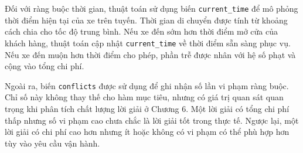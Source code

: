 \documentclass[12pt,a4paper]{article}
\numberwithin{figure}{subsection}
\numberwithin{table}{subsection}
\begin{document}
Đối với ràng buộc thời gian, thuật toán sử dụng biến \texttt{current\_time} để mô phỏng thời điểm hiện tại của xe trên tuyến. Thời gian di chuyển được tính từ khoảng cách chia cho tốc độ trung bình. Nếu xe đến sớm hơn thời điểm mở cửa của khách hàng, thuật toán cập nhật \texttt{current\_time} về thời điểm sẵn sàng phục vụ. Nếu xe đến muộn hơn thời điểm cho phép, phần trễ được nhân với hệ số phạt và cộng vào tổng chi phí.

Ngoài ra, biến \texttt{conflicts} được sử dụng để ghi nhận số lần vi phạm ràng buộc. Chỉ số này không thay thế cho hàm mục tiêu, nhưng có giá trị quan sát quan trọng khi phân tích chất lượng lời giải ở Chương 6. Một lời giải có tổng chi phí thấp nhưng số vi phạm cao chưa chắc là lời giải tốt trong thực tế. Ngược lại, một lời giải có chi phí cao hơn nhưng ít hoặc không có vi phạm có thể phù hợp hơn tùy vào yêu cầu vận hành.
\end{document}
